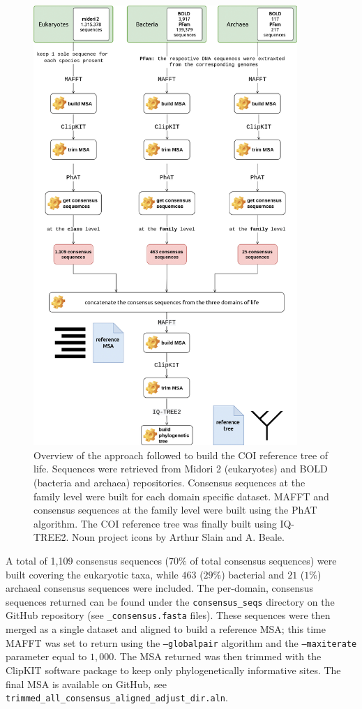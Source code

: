    \begin{figure}
      \centering
      \includegraphics[width=100mm]{figures/darn_methodology.jpg}
      \caption{
         Overview of the approach followed to build the COI reference tree of life. 
         Sequences were retrieved from Midori 2 (eukaryotes) and BOLD (bacteria and archaea) repositories. 
         Consensus sequences at the family level were built for each domain specific dataset. 
         MAFFT and consensus sequences at the family level were built using the PhAT algorithm. 
         The COI reference tree was finally built using IQ-TREE2. 
         Noun project icons by Arthur Slain and A. Beale.
      }
   \end{figure}


   A total of 1,109 consensus sequences ($70\%$ of total consensus sequences) were built covering the eukaryotic taxa, 
   while $463$ ($29\%$) bacterial and $21$ ($1\%$) archaeal consensus sequences were included. 
   The per-domain, consensus sequences returned can be found under the \texttt{consensus\_seqs} directory on 
   the GitHub repository 
   (see \texttt{\_consensus.fasta} files). 
   These sequences were then merged as a single dataset and aligned to build a reference MSA; 
   this time MAFFT was set to return using the \texttt{--globalpair} algorithm and the \texttt{--maxiterate} parameter 
   equal to $1,000$. 
   The MSA returned was then trimmed with the ClipKIT software package \citep{steenwyk2020clipkit} to keep only phylogenetically informative sites. 
   The final MSA is available on GitHub, see \texttt{trimmed\_all\_consensus\_aligned\_adjust\_dir.aln}.

